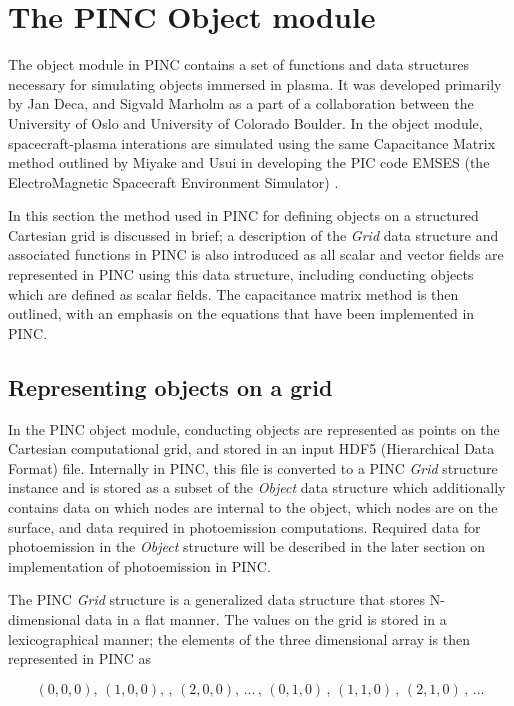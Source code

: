 \section{The PINC Object module}
The object module in PINC contains a set of functions and data structures necessary for simulating objects immersed in plasma. It was developed primarily by Jan Deca, and Sigvald Marholm as a part of a collaboration between the University of Oslo and University of Colorado Boulder. In the object module, spacecraft-plasma interations are simulated using the same Capacitance Matrix method outlined by Miyake and Usui in developing the PIC code EMSES (the ElectroMagnetic Spacecraft Environment Simulator) . 

In this section the method used in PINC for defining objects on a structured Cartesian grid is discussed in brief; a description of the \textit{Grid} data structure and associated functions in PINC is also introduced as all scalar and vector fields are represented in PINC using this data structure, including conducting objects which are defined as scalar fields. The capacitance matrix method is then outlined, with an emphasis on the equations that have been implemented in PINC. 



\subsection{Representing objects on a grid}
In the PINC object module, conducting objects are represented as points on the Cartesian computational grid, and stored in an input HDF5 (Hierarchical Data Format) file. Internally in PINC, this file is converted to a PINC \textit{Grid} structure instance and is stored as a subset of the \textit{Object} data structure which additionally contains data on which nodes are internal to the object, which nodes are on the surface, and data required in photoemission computations. Required data for photoemission in the \textit{Object} structure will be described in the later section on implementation of photoemission in PINC.

The PINC \textit{Grid} structure is a generalized data structure that stores N-dimensional data in a flat manner. The values on the grid is stored in a lexicographical manner; the elements of the three dimensional array is then represented in PINC as

\begin{equation*}
    (0,0,0), \, (1,0,0), \,, \, (2,0,0), \, ... \, , \, (0,1,0) \,, \, (1,1,0) \,, \, (2,1,0) \,, \, ...
\end{equation*}

